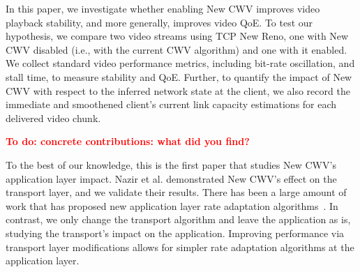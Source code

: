 \documentclass[10pt,sigconf,anonymous]{acmart}
\newcommand{\todo}[1]{\textbf{\textcolor{red}{To do: #1}}}
\begin{document}
In this paper, we investigate whether enabling New CWV improves video playback stability, and more generally, improves video QoE. To test our hypothesis, we compare two video streams using TCP New Reno, one with New CWV disabled (i.e., with the current CWV algorithm) and one with it enabled. We collect standard video performance metrics, including bit-rate oscillation, and stall time, to measure stability and QoE. Further, to quantify the impact of New CWV with respect to the inferred network state at the client, we also record the immediate and smoothened client's current link capacity estimations for each delivered video chunk.%

\todo{concrete contributions: what did you find?}


To the best of our knowledge, this is the first paper that studies New CWV's application layer impact. Nazir et al. \cite{Nazir-2014-performance-evaluation-congestion-window-validation-dash-newcwv} demonstrated New CWV's effect on the transport layer, and we validate their results. There has been a large amount of work that has proposed new application layer rate adaptation algorithms~\cite{Mok-2012-qdash,Huang-2015-A-buffer-based-approach-to-rate-adaptation-bba, Yin-2015-a-control-theoritic-approach}. In contrast, we only change the transport algorithm and leave the application as is, studying the transport's impact on the application. Improving performance via transport layer modifications allows for simpler rate adaptation algorithms at the application layer. %

\end{document}
